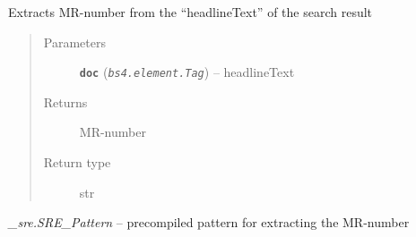 \documentclass[letterpaper,10pt,english]{sphinxmanual}
\begin{document}

\begin{fulllineitems}
\label{modules/mrtools:listb.mrtools.get_mrnumber}
Extracts MR-number from the ``headlineText'' of the search result
\begin{quote}\begin{description}
\item[{Parameters}] \leavevmode
\textbf{\texttt{doc}} (\emph{\texttt{bs4.element.Tag}}) -- headlineText

\item[{Returns}] \leavevmode
MR-number

\item[{Return type}] \leavevmode
str

\end{description}\end{quote}

\begin{fulllineitems}
\label{modules/mrtools:listb.mrtools.PAT}
\emph{\_sre.SRE\_Pattern} -- precompiled pattern for extracting the MR-number

\end{fulllineitems}


\end{fulllineitems}

\end{document}
